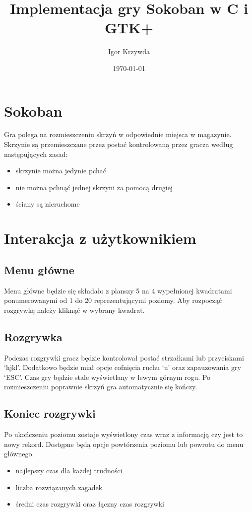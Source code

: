 \documentclass[9pt]{article}
\title{Implementacja gry Sokoban w C i GTK+}
\author{Igor Krzywda}
\date{\today}
\begin{document}
\maketitle

\section{Sokoban}

Gra polega na rozmieszczeniu skrzyń w odpowiednie miejsca w magazynie.
Skrzynie są przemieszczane przez postać kontrolowaną przez gracza według 
następujących zasad:
\begin{itemize}
    \item skrzynie można jedynie pchać
    \item nie można pchnąć jednej skrzyni za pomocą drugiej
    \item ściany są nieruchome
\end{itemize}

\section{Interakcja z użytkownikiem}

\subsection{Menu główne}
Menu główne będzie się składało z planszy 5 na 4 wypełnionej kwadratami 
ponumerowanymi od 1 do 20 reprezentującymi poziomy. Aby rozpocząć rozgrywkę
należy kliknąć w wybrany kwadrat.

\subsection{Rozgrywka}
Podczas rozgrywki gracz będzie kontrolował postać strzałkami lub przyciskami 
`hjkl'. Dodatkowo będzie miał opcje cofnięcia ruchu `u' oraz zapauzowania gry 
`ESC'. Czas gry będzie stale wyświetlany w lewym górnym rogu.
Po rozmieszczeniu poprawnie skrzyń gra automatycznie się kończy.

\subsection{Koniec rozgrywki}
Po ukończeniu poziomu zostaje wyświetlony czas wraz z informacją czy jest to nowy
rekord. Dostępne będą opcje powtórzenia poziomu lub powrotu do menu głównego.

\begin{itemize}
    \item najlepszy czas dla każdej trudności
    \item liczba rozwiązanych zagadek
    \item średni czas rozgrywki oraz łączny czas rozgrywki
\end{itemize}
\end{document}
